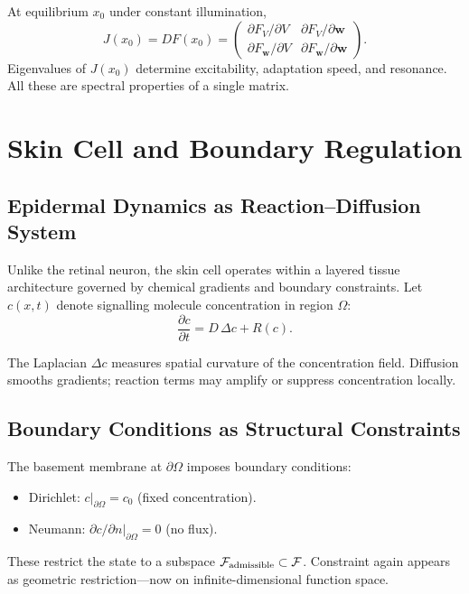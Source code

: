 \documentclass[12pt,openany]{book}
\begin{document}
At equilibrium $x_0$ under constant illumination,
\[
  J(x_0) = DF(x_0) =
  \begin{pmatrix}
    \partial F_V/\partial V & \partial F_V/\partial\mathbf{w} \\
    \partial F_{\mathbf{w}}/\partial V & \partial F_{\mathbf{w}}/\partial\mathbf{w}
  \end{pmatrix}.
\]
Eigenvalues of $J(x_0)$ determine excitability, adaptation speed, and
resonance. All these are spectral properties of a single matrix.

\chapter{Skin Cell and Boundary Regulation}
\label{ch:skin}

\section{Epidermal Dynamics as Reaction--Diffusion System}

Unlike the retinal neuron, the skin cell operates within a layered tissue
architecture governed by chemical gradients and boundary constraints. Let
$c(x,t)$ denote signalling molecule concentration in region $\Omega$:
\[
  \frac{\partial c}{\partial t} = D\,\Delta c + R(c).
\]

The Laplacian $\Delta c$ measures spatial curvature of the concentration field.
Diffusion smooths gradients; reaction terms may amplify or suppress concentration
locally.

\section{Boundary Conditions as Structural Constraints}

The basement membrane at $\partial\Omega$ imposes boundary conditions:
\begin{itemize}[leftmargin=1.5em]
  \item Dirichlet: $c\big|_{\partial\Omega}=c_0$ (fixed concentration).
  \item Neumann: $\partial c/\partial n\big|_{\partial\Omega}=0$ (no flux).
\end{itemize}

These restrict the state to a subspace $\mathcal{F}_{\rm admissible}\subset
\mathcal{F}$. Constraint again appears as geometric restriction—now on
infinite-dimensional function space.
\end{document}
